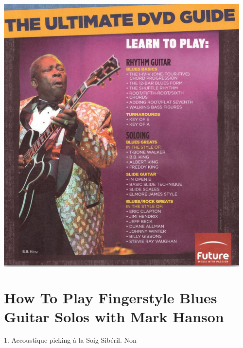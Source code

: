 \documentclass[a4paper]{book}
\begin{document}
\begin{center}
\includegraphics[width=12.804cm,height=14.312cm]{lebluessupportsmethodes-img100.png}
\end{center}
\clearpage


\section[How To Play Fingerstyle Blues Guitar Solos with Mark
Hanson]{How To Play Fingerstyle Blues Guitar Solos with Mark Hanson}
\hypertarget{RefHeadingToc158973218262}{}1. Accoustique picking \`a la
Soig Sib\'eril. Non
\end{document}
